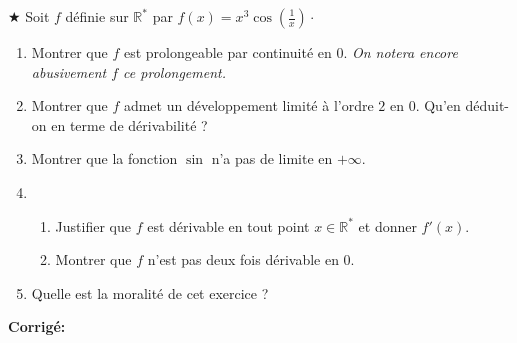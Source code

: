 \documentclass[a4paper,twoside,french,10pt]{VcCours}
\newcommand{\corr}{\textbf{Corrigé:}}
\begin{document}
\begin{Exercice}{$\bigstar$} Soit $f$ définie sur $\mathbb{R}^*$ par $f(x) = x^3 \cos \left( \frac{1}{x} \right) \cdot$

\begin{enumerate}
\item Montrer que $f$ est prolongeable par continuité en $0$. \textit{On notera encore abusivement $f$ ce prolongement.}
\item Montrer que $f$ admet un développement limité à l'ordre $2$ en $0$. Qu'en déduit-on en terme de dérivabilité ?
\item Montrer que la fonction $\sin$ n'a pas de limite en $+ \infty$. 
\item 
\begin{enumerate}
\item Justifier que $f$ est dérivable en tout point $x \in \mathbb{R}^*$ et donner $f'(x)$.
\item Montrer que $f$ n'est pas deux fois dérivable en $0$.
\end{enumerate}
\item Quelle est la moralité de cet exercice ?
\end{enumerate}
\end{Exercice} 

\corr
\end{document}
